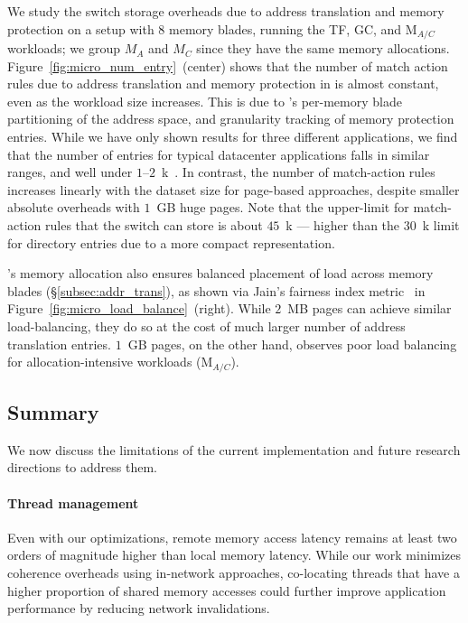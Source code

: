  We study the switch storage overheads due to address translation and memory protection on a setup with 8 memory blades, running the TF, GC, and M$_{A/C}$ workloads; we group $M_A$ and $M_C$ since they have the same memory allocations. Figure~\ref{fig:micro_num_entry}~(center) shows that the number of match action rules due to address translation and memory protection in \mind is almost constant, even as the workload size increases. This is due to \mind's per-memory blade partitioning of the address space, and  granularity tracking of memory protection entries. While we have only shown results for three different applications, we find that the number of  entries for typical datacenter applications falls in similar ranges, and well under $1$--$2$~k~\cite{vma1, vma2}. In contrast, the number of match-action rules increases linearly with the dataset size for page-based approaches, despite smaller absolute overheads with $1$~GB huge pages. Note that the upper-limit for match-action rules that the switch can store is about $45$~k --- higher than the $30$~k limit for directory entries due to a more compact representation.

\mind's memory allocation also ensures balanced placement of load across memory blades (\S\ref{subsec:addr_trans}), as shown via Jain's fairness index metric~\cite{jain} in Figure~\ref{fig:micro_load_balance}~(right). While $2$~MB pages can achieve similar load-balancing, they do so at the cost of much larger number of address translation entries. $1$~GB pages, on the other hand, observes poor load balancing for allocation-intensive workloads (M$_{A/C}$).



\subsection{Summary}

We now discuss the limitations of the current \mind implementation and future research directions to address them.

\paragraph{Thread management} Even with our optimizations, remote memory access latency remains at least two orders of magnitude higher than local memory latency. While our work minimizes coherence overheads using in-network approaches, co-locating threads that have a higher proportion of shared memory accesses could further improve application performance by reducing network invalidations.

